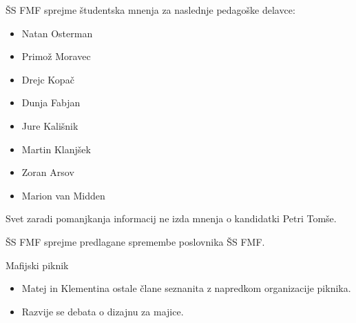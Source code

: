 \documentclass{seja}
\begin{document}
\begin{ad}
    \item
    ŠS FMF sprejme študentska mnenja za naslednje pedagoške delavce:
    \begin{itemize}
        \item Natan Osterman
        \item Primož Moravec
        \item Drejc Kopač
        \item Dunja Fabjan
        \item Jure Kališnik
        \item Martin Klanjšek
        \item Zoran Arsov
        \item Marion van Midden
    \end{itemize}
    Svet zaradi pomanjkanja informacij ne izda mnenja o kandidatki Petri Tomše.

    \item
    \begin{sklep*}
        ŠS FMF sprejme predlagane spremembe poslovnika ŠS FMF.
    \end{sklep*}

    \item
    Mafijski piknik
    \begin{itemize}
        \item Matej in Klementina ostale člane seznanita z napredkom organizacije piknika.
        \item Razvije se debata o dizajnu za majice.
    \end{itemize}

   \end{ad}




\makeatletter \global\let\@enddocumenthook\@empty \makeatother
{}
\end{document}
